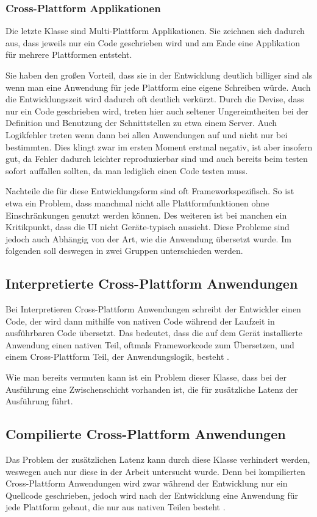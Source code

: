 \subsubsection{Cross-Plattform Applikationen}

Die letzte Klasse sind Multi-Plattform Applikationen. Sie zeichnen sich dadurch aus, dass jeweils nur ein Code geschrieben wird und am Ende eine Applikation für mehrere Plattformen entsteht. 

Sie haben den großen Vorteil, dass sie in der Entwicklung deutlich billiger sind als wenn man eine Anwendung für jede Plattform eine eigene Schreiben würde. Auch die Entwicklungszeit wird dadurch oft deutlich verkürzt. Durch die Devise, dass nur ein Code geschrieben wird, treten hier auch seltener Ungereimtheiten bei der Definition und Benutzung der Schnittstellen zu etwa einem Server. Auch Logikfehler treten wenn dann bei allen Anwendungen auf und nicht nur bei bestimmten. Dies klingt zwar im ersten Moment erstmal negativ, ist aber insofern gut, da Fehler dadurch leichter reproduzierbar sind und auch bereits beim testen sofort auffallen sollten, da man lediglich einen Code testen muss.

Nachteile die für diese Entwicklungsform sind oft Frameworkspezifisch. So ist etwa ein Problem, dass manchmal nicht alle Plattformfunktionen ohne Einschränkungen genutzt werden können. Des weiteren ist bei manchen ein Kritikpunkt, dass die UI nicht Geräte-typisch aussieht. Diese Probleme sind jedoch auch Abhängig von der Art, wie die Anwendung übersetzt wurde. Im folgenden soll deswegen in zwei Gruppen unterschieden werden.

\subsection{Interpretierte Cross-Plattform Anwendungen}
Bei Interpretieren Cross-Plattform Anwendungen schreibt der Entwickler einen Code, der wird dann mithilfe von nativen Code während der Laufzeit in ausführbaren Code übersetzt. Das bedeutet, dass die auf dem Gerät installierte Anwendung einen nativen Teil, oftmals Frameworkcode zum Übersetzen, und einem Cross-Plattform Teil, der Anwendungslogik, besteht \cite{IEEE_development_classes}.

Wie man bereits vermuten kann ist ein Problem dieser Klasse, dass bei der Ausführung eine Zwischenschicht vorhanden ist, die für zusätzliche Latenz der Ausführung führt.

\subsection{Compilierte Cross-Plattform Anwendungen}
Das Problem der zusätzlichen Latenz kann durch diese Klasse verhindert werden, weswegen auch nur diese in der Arbeit untersucht wurde. Denn bei kompilierten Cross-Plattform Anwendungen wird zwar während der Entwicklung nur ein Quellcode geschrieben, jedoch wird nach der Entwicklung eine Anwendung für jede Plattform gebaut, die nur aus nativen Teilen besteht \cite{IEEE_development_classes}.
